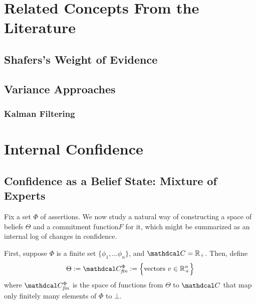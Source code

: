 \documentclass{article}
\def\cofunc{commitment function}
\def\confdom{\mathdcal C}
\def\Rplus{\mathbb R_+}
\begin{document}
\section{Related Concepts From the Literature}

\subsection{Shafers's Weight of Evidence}
\subsection{Variance Approaches}
\subsubsection{Kalman Filtering}

%
\section{Internal Confidence}

\subsection{Confidence as a Belief State: Mixture of Experts}

Fix a set $\Phi$ of assertions.
We now study a natural way of constructing a space of beliefs $\Theta$ and a \cofunc $F$ for it,
which might be summarized as an internal log of changes in confidence. 


First, suppose $\Phi$ is a finite set $\{ \phi_1, \ldots \phi_n\}$, and $\confdom = \Rplus$. 
Then, define
\begin{align*}
	\Theta := \confdom_{\mathit{fin}}^{\Phi} := 
		\Big\{ \text{vectors}~ v \in \mathbb R_+^n \Big\}
\end{align*}
where 
$\confdom_{\mathit{fin}}^\Phi$ is the space of functions from $\Theta$ to $\confdom$ that map only finitely many elements of $\Phi$ to $\bot$.


\end{document}
